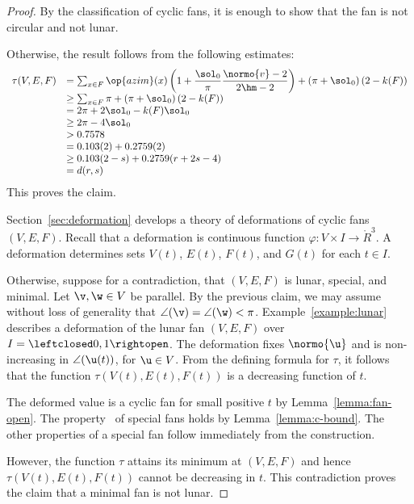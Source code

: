 \begin{proof}
By the classification of cyclic fans, it is enough to show that the
fan is not circular and not lunar.

Otherwise, the result follows from the following estimates:
\begin{displaymath}
\begin{array}{lll}
  \tau(V,E,F) &=\sum_{x\in F} \op{azim}(x)
  \left(1 + \dfrac{\sol_0}{\pi}  \dfrac{\normo{v}-2}{2\hm-2}\right) 
+ \left(\pi+{\sol_0}\right) (2- k(F))\\
  &\ge \sum_{x\in F} \pi + \left(\pi+{\sol_0}\right) (2- k(F))\\
  &= 2\pi + 2\sol_0 - k(F) \sol_0\\
  &\ge 2\pi - 4\sol_0\\
  &> 0.7578\\
  &=0.103 (2) + 0.2759 (2)\\
  &\ge 0.103 (2-s) + 0.2759 (r+2s-4) \\ 
  &= d(r,s)\\
\end{array}
\end{displaymath}
This proves the claim.


Section~\ref{sec:deformation} develops a theory of deformations of
cyclic fans $(V,E,F)$.  Recall that a deformation is continuous
function $\varphi:V\times I\to\ring{R}^3$.  A deformation determines
sets $V(t)$, $E(t)$, $F(t)$, and $G(t)$ for each $t\in I$.


  Otherwise, suppose for a
contradiction, that $(V,E,F)$ is lunar, special, and minimal.  Let
$\v,\w\in V$ be parallel.  By the previous claim, we may assume
without loss of generality that $\angle(\v)=\angle(\w)<\pi$.
Example~\ref{example:lunar} describes a deformation of the lunar fan
$(V,E,F)$ over $I=\leftclosed0,1\rightopen$.  The deformation fixes
$\normo{\u}$ and is non-increasing in $\angle(\u(t))$, for $\u\in V$.
From the defining formula for $\tau$, it follows that the function
$\tau(V(t),E(t),F(t))$ is a decreasing function of $t$.

  The deformed value is a cyclic fan for small positive
$t$ by Lemma~\ref{lemma:fan-open}.  The property~ of
special fans holds by Lemma~\ref{lemma:c-bound}.  The other properties
of a special fan follow immediately from the construction.

However, the function $\tau$ attains its minimum at $(V,E,F)$ and
hence $\tau(V(t),E(t),F(t))$ cannot be decreasing in $t$.  This
contradiction proves the claim that a minimal fan is not lunar.
\end{proof}

